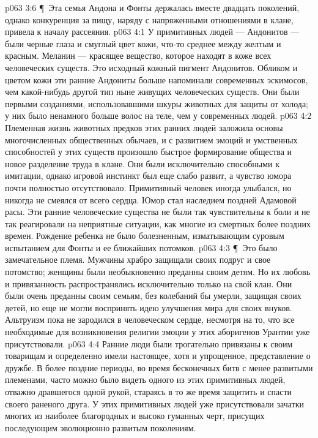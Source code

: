 \vs p063 3:6 \P\ Эта семья Андона и Фонты держалась вместе двадцать поколений, однако конкуренция за пищу, наряду с напряженными отношениями в клане, привела к началу рассеяния.
\vs p063 4:1 У примитивных людей --- Андонитов --- были черные глаза и смуглый цвет кожи, что\hyp{}то среднее между желтым и красным. Меланин --- красящее вещество, которое находят в коже всех человеческих существ. Это исходный кожный пигмент Андонитов. Обликом и цветом кожи эти ранние Андониты больше напоминали современных эскимосов, чем какой\hyp{}нибудь другой тип ныне живущих человеческих существ. Они были первыми созданиями, использовавшими шкуры животных для защиты от холода; у них было ненамного больше волос на теле, чем у современных людей.
\vs p063 4:2 Племенная жизнь животных предков этих ранних людей заложила основы многочисленных общественных обычаев, и с развитием эмоций и умственных способностей у этих существ произошло быстрое формирование общества и новое разделение труда в клане. Они были исключительно способными к имитации, однако игровой инстинкт был еще слабо развит, а чувство юмора почти полностью отсутствовало. Примитивный человек иногда улыбался, но никогда не смеялся от всего сердца. Юмор стал наследием поздней Адамовой расы. Эти ранние человеческие существа не были так чувствительны к боли и не так реагировали на неприятные ситуации, как многие из смертных более поздних времен. Рождение ребенка не было болезненным, изматывающим суровым испытанием для Фонты и ее ближайших потомков.
\vs p063 4:3 \P\ Это было замечательное племя. Мужчины храбро защищали своих подруг и свое потомство; женщины были необыкновенно преданны своим детям. Но их любовь и привязанность распространялись исключительно только на свой клан. Они были очень преданны своим семьям, без колебаний бы умерли, защищая своих детей, но еще не могли воспринять идею улучшения мира для своих внуков. Альтруизм пока не зародился в человеческом сердце, несмотря на то, что все необходимые для возникновения религии эмоции у этих аборигенов Урантии уже присутствовали.
\vs p063 4:4 Ранние люди были трогательно привязаны к своим товарищам и определенно имели настоящее, хотя и упрощенное, представление о дружбе. В более поздние периоды, во время бесконечных битв с менее развитыми племенами, часто можно было видеть одного из этих примитивных людей, отважно дравшегося одной рукой, стараясь в то же время защитить и спасти своего раненого друга. У этих примитивных людей уже присутствовали зачатки многих из наиболее благородных и высоко гуманных черт, присущих последующим эволюционно развитым поколениям.
